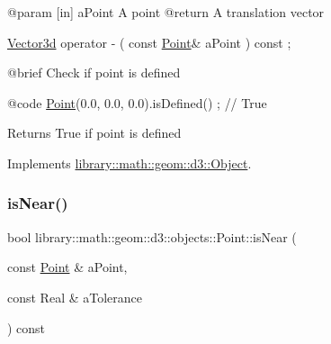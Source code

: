 \begin{DoxyCode}
    @param              [in] aPoint A point
    @\textcolor{keywordflow}{return}             A translation vector

\hyperlink{namespacelibrary_1_1math_1_1obj_a977e84e9bf317a4e7dd9d6d671d6da2f}{Vector3d}                operator -                                  (   \textcolor{keyword}{const}   
      \hyperlink{classlibrary_1_1math_1_1geom_1_1d3_1_1objects_1_1_point_a617e690ab6091af3de729cee337e309e}{Point}&                      aPoint                                      ) \textcolor{keyword}{const} ;

    @brief              Check \textcolor{keywordflow}{if} point is defined
   
    @code
                        \hyperlink{classlibrary_1_1math_1_1geom_1_1d3_1_1objects_1_1_point_a617e690ab6091af3de729cee337e309e}{Point}(0.0, 0.0, 0.0).isDefined() ; \textcolor{comment}{// True}
\end{DoxyCode}


\begin{DoxyReturn}{Returns}
True if point is defined 
\end{DoxyReturn}


Implements \hyperlink{classlibrary_1_1math_1_1geom_1_1d3_1_1_object_a2216442e322f0c3ca5f01a4efa22baf7}{library\+::math\+::geom\+::d3\+::\+Object}.

\mbox{\label{classlibrary_1_1math_1_1geom_1_1d3_1_1objects_1_1_point_a0bcdce172502509f9b9d4e5b3fc75a69}} 
\subsubsection{\texorpdfstring{is\+Near()}{isNear()}}
{\footnotesize\ttfamily bool library\+::math\+::geom\+::d3\+::objects\+::\+Point\+::is\+Near (\begin{DoxyParamCaption}\item[{const \hyperlink{classlibrary_1_1math_1_1geom_1_1d3_1_1objects_1_1_point}{Point} \&}]{a\+Point,  }\item[{const Real \&}]{a\+Tolerance }\end{DoxyParamCaption}) const}



